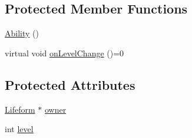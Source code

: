 \subsection*{Protected Member Functions}
\begin{DoxyCompactItemize}
\item 
\hyperlink{classZeta_1_1Ability_a8400f68abcd13d41bfbb1d1cc03b38ff}{Ability} ()
\item 
virtual void \hyperlink{classZeta_1_1Ability_ac81e774451daa9476b02ba442a2ea047}{on\+Level\+Change} ()=0
\end{DoxyCompactItemize}
\subsection*{Protected Attributes}
\begin{DoxyCompactItemize}
\item 
\hyperlink{classZeta_1_1Lifeform}{Lifeform} $\ast$ \hyperlink{classZeta_1_1Ability_ad37bed67f04178297d6fe4c9a2ed619a}{owner}
\item 
int \hyperlink{classZeta_1_1Ability_a41d29a6fb79dd19a7eed5f6a4be5de9a}{level}
\end{DoxyCompactItemize}



